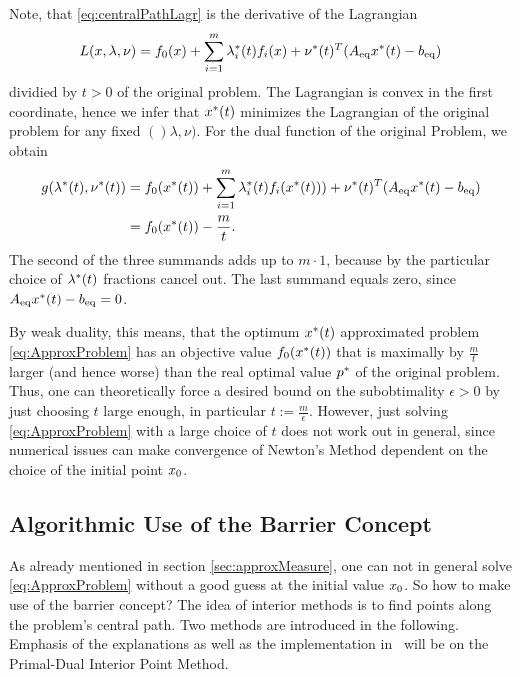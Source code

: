 Note, that \eqref{eq:centralPathLagr} is the derivative of the Lagrangian 
\[ L(x,\lambda,\nu) = f_0(x) + \sum_{i=1}^{m}\lambda_i^*(t) f_i(x) + \nu^*(t) ^T ({A}_{\mathrm{eq}} x^*(t) - {b}_{\mathrm{eq}}) \]
 dividied by $ t>0 $ of the original problem.
The Lagrangian is convex in the first coordinate, hence we infer that $ x^*(t) $ minimizes the Lagrangian  of the original problem for any fixed $ ()\lambda,\nu) $.
For the dual function of the original Problem, we obtain
\begin{align}
	g(\lambda^*(t),\nu^*(t)) &= f_0(x^*(t)) + \sum_{i=1}^{m} \lambda_i^*(t) f_i(x^*(t)))+\nu^*(t) ^T ({A}_{\mathrm{eq}} x^*(t) - {b}_{\mathrm{eq}})\\ & = f_0(x^*(t)) - \frac{m}{t}.
\end{align}
The second of the three summands adds up to $ m\cdot 1 $, because by the particular choice of $ \lambda^*(t) $  fractions cancel out. The last summand equals zero, since $ {A}_{\mathrm{eq}} x^*(t) - {b}_{\mathrm{eq}} = 0$.






By weak duality, this means, that the optimum $ x^*(t) $ approximated problem \eqref{eq:ApproxProblem} has an objective value $ f_0(x^*(t)) $ that is maximally by $ \frac{m}{t} $ larger (and hence worse) than the real optimal value $ p^* $ of the original problem. Thus, one can theoretically force a desired bound on the subobtimality $ \epsilon >0 $ by just choosing $ t $ large enough, in particular $ t := \frac{m}{\epsilon} $. However, just solving \eqref{eq:ApproxProblem} with a large choice of $ t $ does not work out in general, since numerical issues can make convergence of Newton's Method dependent on the choice of the initial point $ x_0 $.

\subsection{Algorithmic Use of the Barrier Concept}
As already mentioned in section \ref{sec:approxMeasure}, one can not in general solve  \eqref{eq:ApproxProblem} without a good guess at the initial value $ x_0 $. So how to make use of the barrier concept? The idea of interior methods is to find points along the problem's central path. Two methods are introduced in the following. Emphasis of the explanations as well as the implementation in \matlab \ will be on the Primal-Dual Interior Point Method.
